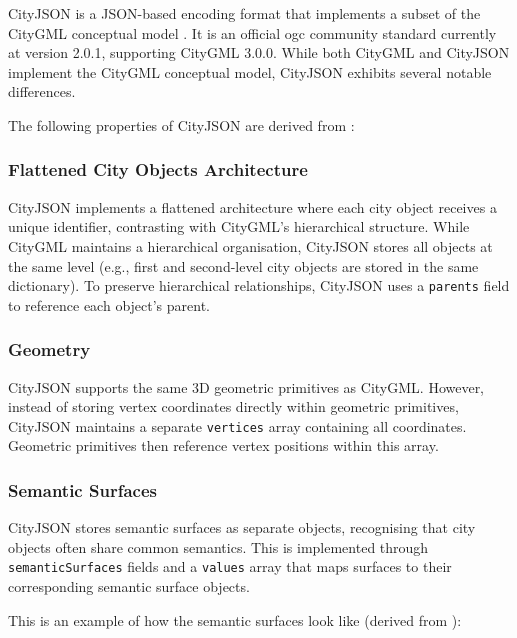 CityJSON is a JSON-based \citep{json} encoding format that implements a subset of the CityGML conceptual model \citep{CityGML}. It is an official \ac{ogc} community standard \citep{ogc} currently at version 2.0.1, supporting CityGML 3.0.0. While both CityGML and CityJSON implement the CityGML conceptual model, CityJSON exhibits several notable differences.

The following properties of CityJSON are derived from \citet{ledoux_2019}:

\subsubsection{Flattened City Objects Architecture}
\label{rw:cityjson:flattened_architecture}

CityJSON implements a flattened architecture where each city object receives a unique identifier, contrasting with CityGML's hierarchical structure. While CityGML maintains a hierarchical organisation, CityJSON stores all objects at the same level (e.g., first and second-level city objects are stored in the same dictionary). To preserve hierarchical relationships, CityJSON uses a \texttt{parents} field to reference each object's parent.

\subsubsection{Geometry}
\label{rw:cityjson:geometry}

CityJSON supports the same 3D geometric primitives as CityGML. However, instead of storing vertex coordinates directly within geometric primitives, CityJSON maintains a separate \texttt{vertices} array containing all coordinates. Geometric primitives then reference vertex positions within this array.

\subsubsection{Semantic Surfaces}
\label{rw:cityjson:semantic_surfaces}

CityJSON stores semantic surfaces as separate objects, recognising that city objects often share common semantics. This is implemented through \texttt{semanticSurfaces} fields and a \texttt{values} array that maps surfaces to their corresponding semantic surface objects.

This is an example of how the semantic surfaces look like (derived from \citet{ledoux_2019}):

